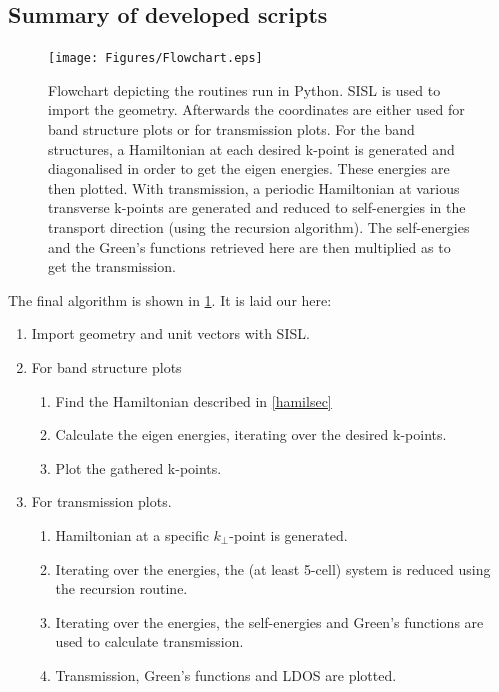 \subsection{Summary of developed scripts}
\begin{figure}[ht]
	\centering
	\texttt{[image: Figures/Flowchart.eps]}
	\caption{Flowchart depicting the routines run in Python. SISL is used to import the geometry. Afterwards the coordinates are either used for band structure plots or for transmission plots. For the band structures, a Hamiltonian at each desired k-point is generated and diagonalised in order to get the eigen energies. These energies are then plotted. With transmission, a periodic Hamiltonian at various transverse k-points are generated and reduced to self-energies in the transport direction (using the recursion algorithm). The self-energies and the Green's functions retrieved here are then multiplied as to get the transmission.}
	\label{Flowchart}
\end{figure}\newpage
The final algorithm is shown in \cref{Flowchart}. It is laid our here:
\begin{enumerate}
	\item Import geometry and unit vectors with SISL.
	\item For band structure plots
	      \begin{enumerate}
		      \item Find the Hamiltonian described in \cref{hamilsec}
		      \item Calculate the eigen energies, iterating over the desired k-points.
		      \item Plot the gathered k-points.
	      \end{enumerate}
	\item For transmission plots.
	      \begin{enumerate}
		      \item Hamiltonian at a specific \(k_{\perp}\)-point is generated.
		      \item Iterating over the energies, the (at least 5-cell) system is reduced using the recursion routine.
		      \item Iterating over the energies, the self-energies and Green's functions are used to calculate transmission.
		      \item Transmission, Green's functions and LDOS are plotted.
	      \end{enumerate}
\end{enumerate}
